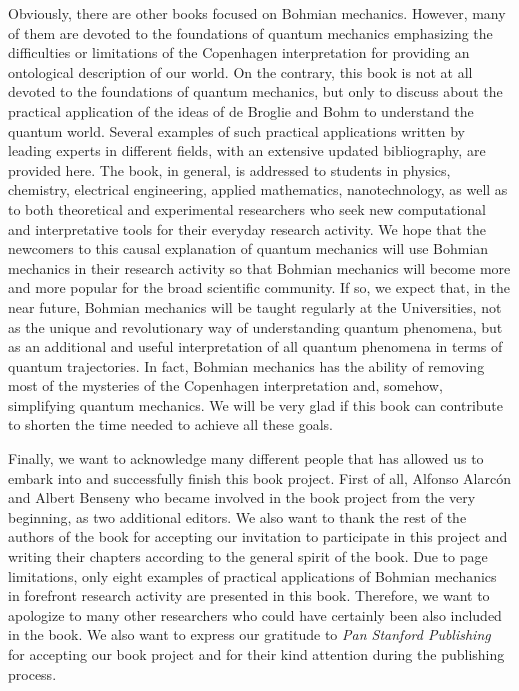 \documentclass[onecolumn,nofootinbib, secnumarabic, amsmath, nobibnotes,11pt,aps,pra]{revtex4-1}
\begin{document}
Obviously, there are other books focused on Bohmian mechanics. However, many of them are devoted to the foundations of quantum mechanics emphasizing the difficulties or limitations of the Copenhagen interpretation for providing an ontological description of our world. On the contrary, this book is not at all devoted to the foundations of quantum mechanics, but only to discuss about the practical application of the ideas of de Broglie and Bohm to understand the quantum world. Several examples of such practical applications written by leading experts in different fields, with an extensive updated bibliography, are provided here.  The book, in general, is addressed to students in physics, chemistry, electrical engineering, applied mathematics, nanotechnology, as well as to both theoretical and experimental researchers who seek new computational and interpretative tools for their everyday research activity. We hope that the newcomers to this causal explanation of quantum mechanics will use Bohmian mechanics in their research activity so that Bohmian mechanics will become more and more popular for the broad scientific community. If so, we expect that, in the near future, Bohmian mechanics will be taught regularly at the Universities, not as the unique and revolutionary way of understanding quantum phenomena, but as an additional and useful interpretation of all quantum phenomena in terms of quantum trajectories. In fact, Bohmian mechanics has the ability of removing most of the mysteries of the Copenhagen interpretation and, somehow, simplifying quantum mechanics. We will be very glad if this book can contribute to shorten the time needed to achieve all these goals.

Finally, we want to acknowledge many different people that has allowed us to embark into and successfully finish this book project. First of all, Alfonso Alarc\'on and Albert Benseny who became involved in the book project from the very beginning, as two additional editors. We also want to thank the rest of the authors of the book for accepting our invitation to participate in this project and writing their chapters according to the general spirit of the book. Due to page limitations, only eight examples of practical applications of Bohmian mechanics in forefront research activity are presented in this book. Therefore, we want to apologize to many other researchers who could have certainly been also included in the book. We also want to express our gratitude to \emph{Pan Stanford Publishing} for accepting our book project and for their kind attention during the publishing process.
\end{document}
